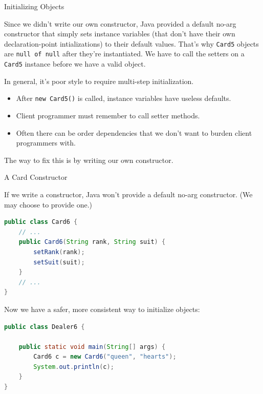 \documentclass{beamer}
\begin{document}
\begin{frame}[fragile]{Initializing Objects}


Since we didn't write our own constructor, Java provided a default no-arg constructor that simply sets instance variables (that don't have their own declaration-point intializations) to their default values.  That's why {\tt Card5} objects are {\tt null of null} after they're instantiated.  We have to call the setters on a {\tt Card5} instance before we have a valid object.\\
\vspace{.1in}

In general, it's poor style to require multi-step initialization.
\begin{itemize}
\item After {\tt new Card5()} is called, instance variables have useless defaults.
\item Client programmer must remember to call setter methods.
\item Often there can be order dependencies that we don't want to burden client programmers with.
\end{itemize}
The way to fix this is by writing our own constructor.

\end{frame}

\begin{frame}[fragile]{A Card Constructor}


If we write a constructor, Java won't provide a default no-arg constructor. (We may choose to provide one.)
\begin{lstlisting}[language=Java]
public class Card6 {
    // ...
    public Card6(String rank, String suit) {
        setRank(rank);
        setSuit(suit);
    }
    // ...
}
\end{lstlisting}

Now we have a safer, more consistent  way to initialize objects:
\begin{lstlisting}[language=Java]
public class Dealer6 {

    public static void main(String[] args) {
        Card6 c = new Card6("queen", "hearts");
        System.out.println(c);
    }
}
\end{lstlisting}

\end{frame}
\end{document}
